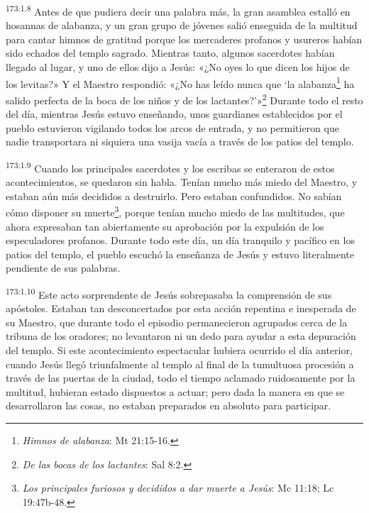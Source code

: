 \par
\textsuperscript{173:1.8} Antes de que pudiera decir una palabra más, la gran asamblea estalló en hosannas de alabanza, y un gran grupo de jóvenes salió enseguida de la multitud para cantar himnos de gratitud porque los mercaderes profanos y usureros habían sido echados del templo sagrado. Mientras tanto, algunos sacerdotes habían llegado al lugar, y uno de ellos dijo a Jesús: «¿No oyes lo que dicen los hijos de los levitas?» Y el Maestro respondió: «¿No has leído nunca que `la alabanza\footnote{\textit{Himnos de alabanza}: Mt 21:15-16.} ha salido perfecta de la boca de los niños y de los lactantes?'»\footnote{\textit{De las bocas de los lactantes}: Sal 8:2.} Durante todo el resto del día, mientras Jesús estuvo enseñando, unos guardianes establecidos por el pueblo estuvieron vigilando todos los arcos de entrada, y no permitieron que nadie transportara ni siquiera una vasija vacía a través de los patios del templo.

\par
\textsuperscript{173:1.9} Cuando los principales sacerdotes y los escribas se enteraron de estos acontecimientos, se quedaron sin habla. Tenían mucho más miedo del Maestro, y estaban aún más decididos a destruirlo. Pero estaban confundidos. No sabían cómo disponer su muerte\footnote{\textit{Los principales furiosos y decididos a dar muerte a Jesús}: Mc 11:18; Lc 19:47b-48.}, porque tenían mucho miedo de las multitudes, que ahora expresaban tan abiertamente su aprobación por la expulsión de los especuladores profanos. Durante todo este día, un día tranquilo y pacífico en los patios del templo, el pueblo escuchó la enseñanza de Jesús y estuvo literalmente pendiente de sus palabras.

\par
\textsuperscript{173:1.10} Este acto sorprendente de Jesús sobrepasaba la comprensión de sus apóstoles. Estaban tan desconcertados por esta acción repentina e inesperada de su Maestro, que durante todo el episodio permanecieron agrupados cerca de la tribuna de los oradores; no levantaron ni un dedo para ayudar a esta depuración del templo. Si este acontecimiento espectacular hubiera ocurrido el día anterior, cuando Jesús llegó triunfalmente al templo al final de la tumultuosa procesión a través de las puertas de la ciudad, todo el tiempo aclamado ruidosamente por la multitud, hubieran estado dispuestos a actuar; pero dada la manera en que se desarrollaron las cosas, no estaban preparados en absoluto para participar.

